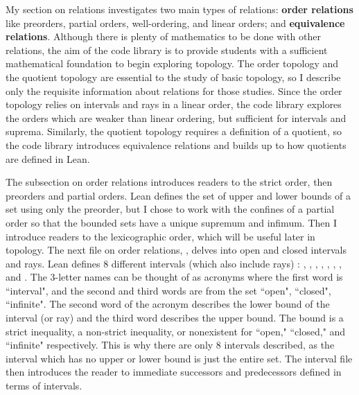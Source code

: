 My section on relations investigates two main types of relations: 
\textbf{order relations} like preorders, partial orders, well-ordering, 
and linear orders; and \textbf{equivalence relations}. Although there is 
plenty of mathematics to be done with other relations, the aim of the code library is to
provide students with a sufficient mathematical foundation to begin exploring topology.
The order topology and the quotient topology are essential to the study of basic topology, 
so I describe only the requisite information about relations for those studies. Since the order 
topology relies on intervals and rays in a linear order, the code library explores the orders
which are weaker than linear ordering, but sufficient for intervals and suprema. Similarly, 
the quotient topology requires a definition of a quotient, so the code library introduces equivalence
relations and builds up to how quotients are defined in Lean.

The subsection on order relations introduces readers to the strict order, then preorders
and partial orders. Lean defines the set of upper and lower bounds of a set using only 
the preorder, but I chose to work with the confines of a partial order so that the 
bounded sets have a unique supremum and infimum. Then I introduce readers to the lexicographic
order, which will be useful later in topology. The next file on order relations, , delves into 
open and closed intervals and rays. Lean defines 8 different intervals (which also include rays) : 
, , , , , , , and .
The 3-letter names can be thought of as acronyms where the first word is ``interval", and the 
second and third words are from the set {``open", ``closed", ``infinite"}. The second word of the 
acronym describes the lower bound of the interval (or ray) and the third word describes the 
upper bound. The bound is a strict inequality, a non-strict inequality, or nonexistent for
``open," ``closed," and ``infinite" respectively. This is why there are only 8 intervals described, 
as the interval which has no upper or lower bound is just the entire set. The interval file then
introduces the reader to immediate successors and predecessors defined in terms of intervals.

